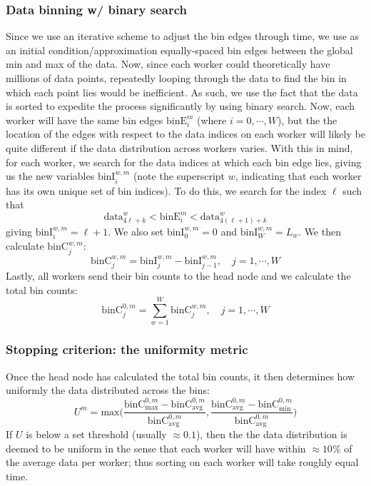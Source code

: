 \documentclass{article}
\begin{document}
\subsubsection{Data binning w/ binary search}
Since we use an iterative scheme to adjust the bin edges through time, we use as an initial condition/approximation equally-spaced bin edges between the global min and max of the data. Now, since each worker could theoretically have millions of data points, repeatedly looping through the data to find the bin in which each point lies would be inefficient. As such, we use the fact that the data is sorted to expedite the process significantly by using binary search. Now, each worker will have the same bin edges $\textrm{binE}^m_i$ (where $i = 0, \cdots, W$), but the the location of the edges with respect to the data indices on each worker will likely be quite different if the data distribution across workers varies. With this in mind, for each worker, we search for the data indices at which each bin edge lies, giving us the new variables $\textrm{binI}^{w,m}_i$ (note the superscript $w$, indicating that each worker has its own unique set of bin indices). To do this, we search for the index $\ell$ such that
\begin{equation}
	\textrm{data}^w_{4\ell+k} < \textrm{binE}^m_i < \textrm{data}^w_{{4(\ell+1)+k}}
\end{equation}
giving $\textrm{binI}^{w,m}_i = \ell+1$. We also set $\textrm{binI}^{w,m}_0 = 0$ and $\textrm{binI}^{w,m}_W = L_w$. We then calculate $\textrm{binC}^{w,m}_j$:
\begin{equation}
	\textrm{binC}^{w,m}_j = \textrm{binI}^{w,m}_j - \textrm{binI}^{w,m}_{j-1}, \quad j = 1, \cdots, W
\end{equation}
Lastly, all workers send their bin counts to the head node and we calculate the total bin counts:
\begin{equation}
	\textrm{binC}^{0,m}_j = \sum_{w=1}^{W} \textrm{binC}^{w,m}_j, \quad j = 1, \cdots, W
\end{equation}


\subsubsection{Stopping criterion: the uniformity metric}
Once the head node has calculated the total bin counts, it then determines how uniformly the data distributed across the bins:
\begin{equation}
	U^m = \textrm{max} \bigg( \dfrac{\textrm{binC}^{0,m}_{\textrm{max}} - \textrm{binC}^{0,m}_{\textrm{avg}}}{\textrm{binC}^{0,m}_{\textrm{avg}}}, \dfrac{\textrm{binC}^{0,m}_{\textrm{avg}} - \textrm{binC}^{0,m}_{\textrm{min}}}{\textrm{binC}^{0,m}_{\textrm{avg}}} \bigg)
\end{equation}
If $U$ is below a set threshold (usually $\approx 0.1$), then the the data distribution is deemed to be uniform in the sense that each worker will have within $\approx 10\%$ of the average data per worker; thus sorting on each worker will take roughly equal time.
\end{document}
